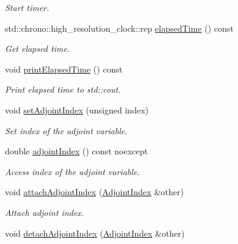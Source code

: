 \begin{DoxyCompactItemize}
\begin{DoxyCompactList}\small\item\em Start timer. \end{DoxyCompactList}\item 
std\+::chrono\+::high\+\_\+resolution\+\_\+clock\+::rep \hyperlink{classSpacy_1_1Mixin_1_1Timer_ab27a20d8e1e9bc90ea56cb18ff752798_ab27a20d8e1e9bc90ea56cb18ff752798}{elapsed\+Time} () const
\begin{DoxyCompactList}\small\item\em Get elapsed time. \end{DoxyCompactList}\item 
\hypertarget{classSpacy_1_1Mixin_1_1Timer_a3b79b35213702118d0823f6040d5a315}{}void \hyperlink{classSpacy_1_1Mixin_1_1Timer_a3b79b35213702118d0823f6040d5a315}{print\+Elapsed\+Time} () const\label{classSpacy_1_1Mixin_1_1Timer_a3b79b35213702118d0823f6040d5a315}

\begin{DoxyCompactList}\small\item\em Print elapsed time to std\+::cout. \end{DoxyCompactList}\item 
void \hyperlink{classSpacy_1_1Mixin_1_1AdjointIndex_a30d4dd8b61175144c84c5bbf964528d7_a30d4dd8b61175144c84c5bbf964528d7}{set\+Adjoint\+Index} (unsigned index)
\begin{DoxyCompactList}\small\item\em Set index of the adjoint variable. \end{DoxyCompactList}\item 
double \hyperlink{classSpacy_1_1Mixin_1_1AdjointIndex_afd5c0f6bd67d20c88ea65b7f8fe4ab45_afd5c0f6bd67d20c88ea65b7f8fe4ab45}{adjoint\+Index} () const noexcept
\begin{DoxyCompactList}\small\item\em Access index of the adjoint variable. \end{DoxyCompactList}\item 
void \hyperlink{classSpacy_1_1Mixin_1_1AdjointIndex_a6ac8bb62f7d40cdf7aee68539026a647_a6ac8bb62f7d40cdf7aee68539026a647}{attach\+Adjoint\+Index} (\hyperlink{classSpacy_1_1Mixin_1_1AdjointIndex_a18dca16025bfc2af67da2eee34be9699_a18dca16025bfc2af67da2eee34be9699}{Adjoint\+Index} \&other)
\begin{DoxyCompactList}\small\item\em Attach adjoint index. \end{DoxyCompactList}\item 
\hypertarget{classSpacy_1_1Mixin_1_1AdjointIndex_af07504e2900cd83446469b4bb0ce0a4a}{}void \hyperlink{classSpacy_1_1Mixin_1_1AdjointIndex_af07504e2900cd83446469b4bb0ce0a4a}{detach\+Adjoint\+Index} (\hyperlink{classSpacy_1_1Mixin_1_1AdjointIndex_a18dca16025bfc2af67da2eee34be9699_a18dca16025bfc2af67da2eee34be9699}{Adjoint\+Index} \&other)\label{classSpacy_1_1Mixin_1_1AdjointIndex_af07504e2900cd83446469b4bb0ce0a4a}


\end{DoxyCompactItemize}
